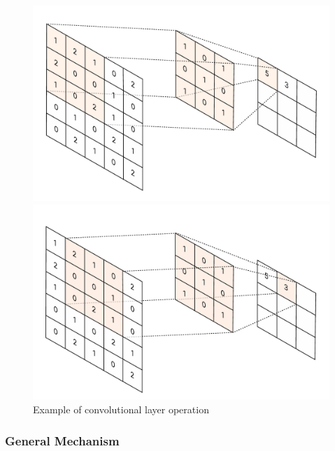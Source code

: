 \documentclass{pracalicmgr}
\begin{document}
\begin{figure}[H]
    \centering
    \begin{minipage}[t]{0.48\textwidth}
        \centering
        \includegraphics[width=\textwidth]{src/conv1.pdf}
    \end{minipage}
    \hfill
    \begin{minipage}[t]{0.48\textwidth}
        \centering
        \includegraphics[width=\textwidth]{src/conv2.pdf}
    \end{minipage}
    \caption{Example of convolutional layer operation \cite{Yamashita2018}}
    \label{fig:conv_layer}
\end{figure}

\subsubsection{General Mechanism}
\end{document}
